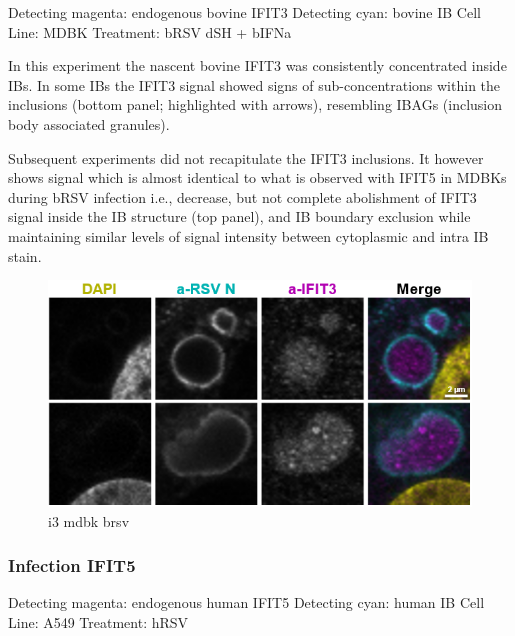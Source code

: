 Detecting magenta: endogenous bovine IFIT3 \newline
Detecting cyan: bovine IB \newline
Cell Line: MDBK \newline
Treatment: bRSV dSH + bIFNa \newline

In this experiment the nascent bovine IFIT3 was consistently concentrated inside IBs. In some IBs the IFIT3 signal showed signs of sub-concentrations within the inclusions (bottom panel; highlighted with arrows), resembling IBAGs (inclusion body associated granules).

Subsequent experiments did not recapitulate the IFIT3 inclusions. It however shows signal which is almost identical to what is observed with IFIT5 in MDBKs during bRSV infection i.e., decrease, but not complete abolishment of IFIT3 signal inside the IB structure (top panel), and IB boundary exclusion while maintaining similar levels of signal intensity between cytoplasmic and intra IB stain.

\begin{figure}
    \centering
    \includegraphics[width=1\linewidth]{09. Chapter 4/Figs/02. Infection/06. mdbk i3.png}
    \caption[i3 mdbk brsv]{i3 mdbk brsv}
    \label{fig:i3 mdbk brsv}
\end{figure}

\subsubsection{Infection IFIT5}
Detecting magenta: endogenous human IFIT5 \newline
Detecting cyan: human IB \newline
Cell Line: A549 \newline
Treatment: hRSV \newline

